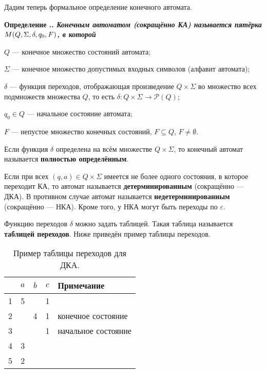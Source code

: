 \documentclass[10pt]{report}
\newcounter{exam}[section]
\newcounter{defin}[section]
\renewcommand{\thedefin}{\thesection.\arabic{defin}}
\newenvironment{Definition}{\par\refstepcounter{defin}\bf Определение \thedefin.\sl}{\rm\par}
\begin{document}
Дадим теперь формальное определение конечного автомата.
\begin{Definition}
\textbf{Конечным автоматом} (сокращённо КА) называется пятёрка $M(Q,\Sigma,\delta,\\ q_0,F)$, в которой

$Q$ --- конечное множество состояний автомата;

$\Sigma$ --- конечное множество допустимых входных символов (алфавит автомата);

$\delta$ --- функция переходов, отображающая произведение $Q\times\Sigma$ во множество всех подмножеств множества $Q$, то есть $\delta:Q\times\Sigma\to\mathcal{P}(Q)$;

$q_0\in Q$ --- начальное состояние автомата;

$F$ --- непустое множество конечных состояний, $F\subseteq Q$, $F\neq\emptyset$.

Если функция $\delta$ определена на всём множестве $Q\times\Sigma$, то конечный автомат называется \textbf{полностью определённым}.

Если при всех $(q,a)\in Q\times\Sigma$ имеется не более одного состояния, в которое переходит КА, то автомат называется \textbf{детерминированным} (сокращённо --- ДКА). В
противном случае автомат называется \textbf{недетерминированным} (сокращённо --- НКА). Кроме того, у НКА могут быть переходы по $\varepsilon$.
\end{Definition}

Функцию переходов $\delta$ можно задать таблицей. Такая таблица называется \textbf{таблицей переходов}. Ниже приведён пример таблицы переходов.
\begin{table}[!h]
\centering
\caption{Пример таблицы переходов для ДКА.}\label{Goto.table.example}
\vspace{1mm}
\begin{tabular}{|l|c|c|c|l|}  \hline
    & $a$   & $b$  & $c$     & Примечание           \\  \hline
1   & 5     &      & 1       &                      \\  \hline
2   &       & 4    & 1       & конечное состояние   \\  \hline
3   &       &      & 1       & начальное состояние  \\  \hline
4   & 3     &      &         &                      \\  \hline
5   & 2     &      &         &                      \\  \hline
\end{tabular}
\end{table}
\end{document}
